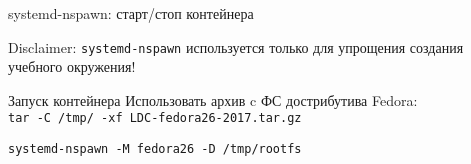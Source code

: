 \begin{frame}[fragile]{systemd-nspawn: старт/стоп контейнера}
    \begin{alert}{Disclaimer}:
        {\tt systemd-nspawn} используется только для упрощения создания учебного окружения!
    \end{alert}
    \begin{block}{Запуск контейнера}
        Использовать архив c ФС дострибутива Fedora:\\
        {\tt tar -C /tmp/ -xf LDC-fedora26-2017.tar.gz}

	\begin{lstlisting}
systemd-nspawn -M fedora26 -D /tmp/rootfs
\end{lstlisting}
    \end{block}
\end{frame}